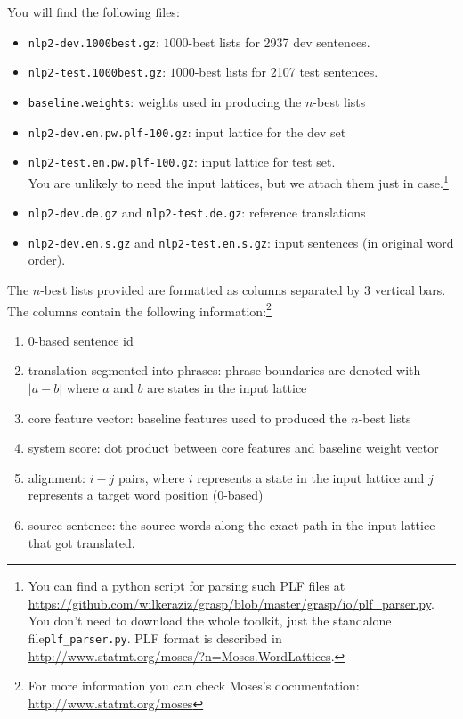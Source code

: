 You will find the following files:

\begin{itemize}
    \item \texttt{nlp2-dev.1000best.gz}: $1000$-best lists for 2937 dev sentences.
    \item \texttt{nlp2-test.1000best.gz}: $1000$-best lists for 2107 test sentences.
    \item \texttt{baseline.weights}: weights used in producing the $n$-best lists
    \item \texttt{nlp2-dev.en.pw.plf-100.gz}: input lattice for the dev set
    \item \texttt{nlp2-test.en.pw.plf-100.gz}: input lattice for test set.\\
    You are unlikely to need the input lattices, but we attach them just in case.\footnote{You can find a python script for parsing such PLF files at \url{https://github.com/wilkeraziz/grasp/blob/master/grasp/io/plf_parser.py}. You don't need to download the whole toolkit, just the standalone file\texttt{plf\_parser.py}. PLF format is described in \url{http://www.statmt.org/moses/?n=Moses.WordLattices}.}
    \item \texttt{nlp2-dev.de.gz} and \texttt{nlp2-test.de.gz}: reference translations
    \item \texttt{nlp2-dev.en.s.gz} and \texttt{nlp2-test.en.s.gz}: input sentences (in original word order).
\end{itemize}


The $n$-best lists provided are formatted as columns separated by 3 vertical bars. The columns contain the following information:\footnote{For more information you can check Moses's documentation: \url{http://www.statmt.org/moses}}

\begin{enumerate}
    \item $0$-based sentence id
    \item translation segmented into phrases: phrase boundaries are denoted with $|a-b|$ where $a$ and $b$ are states in the input lattice
    \item core feature vector: baseline features used to produced the $n$-best lists
    \item system score: dot product between core features and baseline weight vector
    \item alignment: $i-j$ pairs, where $i$ represents a state in the input lattice and $j$ represents a target word position ($0$-based)
    \item source sentence: the source words along the exact path in the input lattice that got translated.
\end{enumerate}
